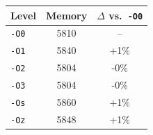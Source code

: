 \begin{tabular*}{\columnwidth}{@{\extracolsep\fill}lcc@{\extracolsep\fill}}
\toprule
\textbf{Level} & \textbf{Memory} & \textbf{$\Delta$ vs.\ \texttt{-O0}} \\
\midrule
\texttt{-O0} & 5810 & -- \\
\texttt{-O1} & 5840 & +1\% \\
\texttt{-O2} & 5804 & -0\% \\
\texttt{-O3} & 5804 & -0\% \\
\texttt{-Os} & 5860 & +1\% \\
\texttt{-Oz} & 5848 & +1\% \\
\bottomrule
\end{tabular*}

